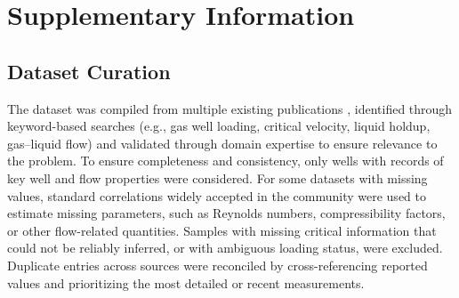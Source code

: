 \documentclass[article.tex]{subfiles}
\begin{document}
\section*{Supplementary Information}

\subsection*{Dataset Curation}
The dataset was compiled from multiple existing publications \cite{Turner1969, WangD2018, Chen2016}, identified through keyword-based searches (e.g., gas well loading, critical velocity, liquid holdup, gas–liquid flow) and validated through domain expertise to ensure relevance to the problem. To ensure completeness and consistency, only wells with records of key well and flow properties were considered. For some datasets with missing values, standard correlations widely accepted in the community were used to estimate missing parameters, such as Reynolds numbers, compressibility factors, or other flow-related quantities. Samples with missing critical information that could not be reliably inferred, or with ambiguous loading status, were excluded. Duplicate entries across sources were reconciled by cross-referencing reported values and prioritizing the most detailed or recent measurements.

\end{document}
